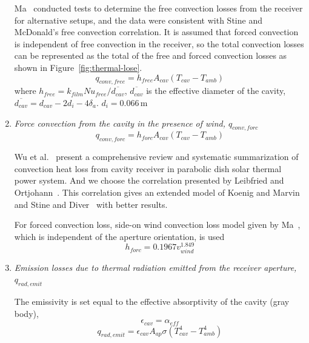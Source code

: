 \begin{enumerate}[label=(\arabic*)]
  Ma~\cite{Ma1993} conducted tests to determine the free convection losses from the receiver for alternative setups, and the data were consistent with Stine and McDonald's free convection correlation. It is assumed that forced convection is independent of free convection in the receiver, so the total convection losses can be represented as the total of the free and forced convection losses as shown in Figure~\ref{fig:thermal-lose}.  
  \begin{equation}
	q_{conv,free} = h_{free}A_{cav}(T_{cav}-T_{amb})
\end{equation}
where $h_{free}=k_{film}Nu_{free}/\overline{d_{cav}}$, $\overline{d_{cav}}$ is the effective diameter of the cavity, $\overline{d_{cav}}=d_{cav}-2d_i-4 \delta_a$.
$d_{i}=$0.066$\,$m
  
  \item \emph{Force convection from the cavity in the presence of wind, $q_{conv,forc}$}  
  \begin{equation}
	q_{conv,forc} = h_{forc}A_{cav}(T_{cav}-T_{amb})
\end{equation}

    Wu et al.~\cite{Wu2010} present a comprehensive review and systematic summarization of convection heat loss from cavity receiver in parabolic dish solar thermal power system. And we choose the correlation presented by Leibfried and Ortjohann~\cite{Leibfried1995}. This correlation gives an extended model of Koenig and Marvin~\cite{Koenig1981} and Stine and Diver~\cite{Stine1994} with better results.

For forced convection loss, side-on wind convection loss model given by Ma~\cite{Ma1993}, which is independent of the aperture orientation, is used
\begin{equation}
	h_{forc}=0.1967v_{wind}^{1.849}
\end{equation}

  \item \emph{Emission losses due to thermal radiation emitted from the receiver aperture, $q_{rad,emit}$}
  
  The emissivity is set equal to the effective absorptivity of the cavity (gray body),
\begin{equation}
    \epsilon_{cav}=\alpha_{eff}
\end{equation}
\begin{equation}
    q_{rad,emit}=\epsilon_{cav}A_{ap}\sigma(T_{cav}^{4}-T_{amb}^{4})
\end{equation}
\end{enumerate}

